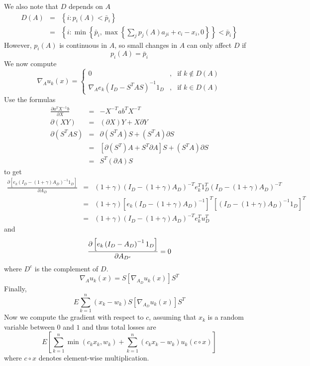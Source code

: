 \documentclass{article}
\begin{document}
We also note that $D$ depends on $A$ 
\begin{eqnarray*}
D\left( A\right)  &=&\left\{ i:p_{i}\left( A\right) <\bar{p}_{i}\right\}  \\
&=&\left\{ i:\min \left\{ \bar{p}_{i},\max \left\{ \sum_{j}p_{j}\left(
A\right) a_{ji}+c_{i}-x_{i},0\right\} \right\} <\bar{p}_{i}\right\} 
\end{eqnarray*}%
However, $p_{i}\left( A\right) $ is continuous in $A$, so small changes in $A
$ can only affect $D$ if%
\[
p_{i}\left( A\right) =\bar{p}_{i}
\]%
We now compute%
\[
\nabla _{A}u_{k}\left( x\right) =\left\{ 
\begin{array}{ccc}
0 & , & \text{if }k\notin D\left( A\right)  \\ 
\nabla _{A}e_{k}\left( I_{D}-S^{T}AS\right) ^{-1}1_{D} & , & \text{if }k\in
D\left( A\right) 
\end{array}%
\right. 
\]%
Use the formulas%
\begin{eqnarray*}
\frac{\partial a^{T}X^{-1}b}{\partial X} &=&-X^{-T}ab^{T}X^{-T} \\
\partial \left( XY\right)  &=&\left( \partial X\right) Y+X\partial Y \\
\partial \left( S^{T}AS\right)  &=&\partial \left( S^{T}A\right) S+\left(
S^{T}A\right) \partial S \\
&=&\left[ \partial \left( S^{T}\right) A+S^{T}\partial A\right] S+\left(
S^{T}A\right) \partial S \\
&=&S^{T}\left( \partial A\right) S
\end{eqnarray*}%
to get%
\begin{eqnarray*}
\frac{\partial \left[ e_{k}\left( I_{D}-\left( 1+\gamma \right) A_{D}\right)
^{-1}1_{D}\right] }{\partial A_{D}} &=&\left( 1+\gamma \right) \left(
I_{D}-\left( 1+\gamma \right) A_{D}\right) ^{-T}e_{k}^{T}1_{D}^{T}\left(
I_{D}-\left( 1+\gamma \right) A_{D}\right) ^{-T} \\
&=&\left( 1+\gamma \right) \left[ e_{k}\left( I_{D}-\left( 1+\gamma \right)
A_{D}\right) ^{-1}\right] ^{T}\left[ \left( I_{D}-\left( 1+\gamma \right)
A_{D}\right) ^{-1}1_{D}\right] ^{T} \\
&=&\left( 1+\gamma \right) \left( I_{D}-\left( 1+\gamma \right) A_{D}\right)
^{-T}e_{k}^{T}u_{D}^{T}
\end{eqnarray*}%
and 
\[
\frac{\partial \left[ e_{k}\left( I_{D}-A_{D}\right) ^{-1}1_{D}\right] }{%
\partial A_{D^{c}}}=0
\]%
where $D^{c}$ is the complement of $D$.%
\[
\nabla _{A}u_{k}\left( x\right) =S\left[ \nabla _{A_{D}}u_{k}\left( x\right) %
\right] S^{T}
\]%
Finally, 
\[
E\sum_{k=1}^{n}\left( x_{k}-w_{k}\right) S\left[ \nabla _{A_{D}}u_{k}\left(
x\right) \right] S^{T}
\]%
Now we compute the gradient with respect to $c$, assuming that $x_{k}$ is a
random variable between $0$ and $1$ and thus total losses are%
\[
E\left[ \sum_{k=1}^{n}\min \left( c_{k}x_{k},w_{k}\right)
+\sum_{k=1}^{n}\left( c_{k}x_{k}-w_{k}\right) u_{k}\left( c\circ x\right) %
\right] 
\]%
where $c\circ x$ denotes element-wise multiplication.
\end{document}

